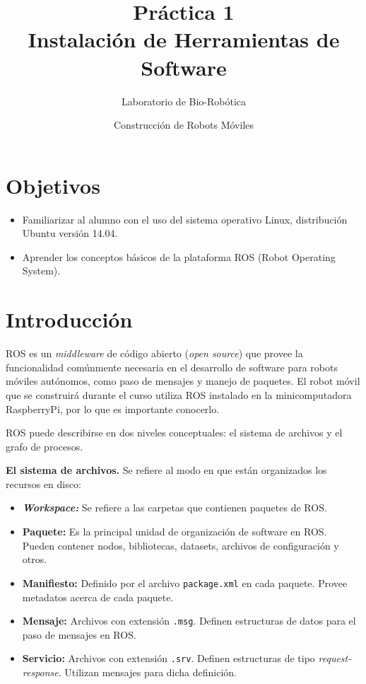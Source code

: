 \documentclass[letterpaper,12pt]{article}
\title{Práctica 1 \\ Instalación de Herramientas de Software}
\author{Laboratorio de Bio-Robótica}
\date{Construcción de Robots Móviles}
\begin{document}
\renewcommand{\tablename}{Tabla}
\maketitle
\section*{Objetivos}
\begin{itemize}
\item Familiarizar al alumno con el uso del sistema operativo Linux, distribución Ubuntu versión 14.04.
\item Aprender los conceptos básicos de la plataforma ROS (Robot Operating System).
\end{itemize}
 
\section{Introducción}
ROS es un \textit{middleware} de código abierto (\textit{open source}) que provee la funcionalidad comúnmente necesaria en el desarrollo de software para robots móviles autónomos, como paso de mensajes y manejo de paquetes. El robot móvil que se construirá durante el curso utiliza ROS instalado en la minicomputadora RaspberryPi, por lo que es importante conocerlo.

ROS puede describirse en dos niveles conceptuales: el sistema de archivos y el grafo de procesos.

\textbf{El sistema de archivos.} Se refiere al modo en que están organizados los recursos en disco:
\begin{itemize}
\item \textbf{\textit{Workspace:}} Se refiere a las carpetas que contienen paquetes de ROS.
\item \textbf{Paquete:} Es la principal unidad de organización de software en ROS. Pueden contener nodos, bibliotecas, datasets, archivos de configuración y otros.
\item \textbf{Manifiesto:} Definido por el archivo \texttt{package.xml} en cada paquete. Provee metadatos acerca de cada paquete. 
\item \textbf{Mensaje:} Archivos con extensión \texttt{.msg}. Definen estructuras de datos para el paso de mensajes en ROS.
\item \textbf{Servicio:} Archivos con extensión \texttt{.srv}. Definen estructuras de tipo \textit{request-response}. Utilizan mensajes para dicha definición.
\end{itemize}
\end{document}
